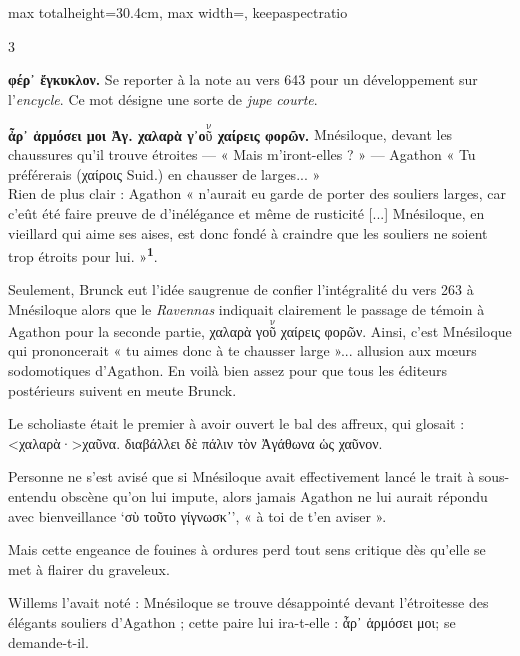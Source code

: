 \documentclass[11pt,twoside]{book}
\newcommand{\italique}[1]{\textit{#1}}
\newcommand{\auDessus}[2]{$\overset{\text{#2}}{\text{#1}}$}
\newlength{\larg}
\newcommand{\marqueur}[1]{\textsuperscript{\color{rubricRed}\textbf{#1}}}
\begin{document}
\begin{adjustbox}{max totalheight=30.4cm, max width=\textwidth, keepaspectratio}
\begin{minipage}{\textwidth}
{\begin{multicols}{3}
\par\vspace{1.5pt}
 \textbf{φέρ᾽ ἔγκυκλον.} Se reporter à la note au vers 643 pour un développement sur l'\italique{encycle}. Ce mot désigne une sorte de \italique{jupe courte}.
\par\vspace{1.5pt}
 \textbf{ἆρ᾽ ἁρμόσει μοι Ἀγ. χαλαρὰ γ᾽ο\auDessus{ῦ}{ν} χαίρεις φορῶν.} Mnésiloque, devant les chaussures qu'il trouve étroites --- « Mais m'iront-elles ? » --- Agathon « Tu préférerais (χαίροις Suid.) en chausser de larges... »\\ Rien de plus clair : Agathon « n'aurait eu garde de porter des souliers larges, car c'eût été faire preuve de d'inélégance et même de rusticité [...] Mnésiloque, en vieillard qui aime ses aises, est donc fondé à craindre que les souliers ne soient trop étroits pour lui. »\marqueur{1}.
\par\vspace{1.5pt}
\noindent Seulement, Brunck eut l'idée saugrenue de confier l'intégralité du vers 263 à Mnésiloque alors que le \italique{Ravennas} indiquait clairement le passage de témoin à Agathon pour la seconde partie, χαλαρὰ γο\auDessus{ῦ}{ν} χαίρεις φορῶν. Ainsi, c'est Mnésiloque qui prononcerait « tu aimes donc à te chausser large »... allusion aux mœurs sodomotiques d'Agathon. En voilà bien assez pour que tous les éditeurs postérieurs suivent en meute Brunck.
\par\vspace{1.5pt}
\noindent Le scholiaste était le premier à avoir ouvert le bal des affreux, qui glosait : <χαλαρὰ·>χαῦνα. διαβάλλει δὲ πάλιν τὸν Ἀγάθωνα ὡς χαῦνον.
\par\vspace{1.5pt}
\noindent Personne ne s'est avisé que si Mnésiloque avait effectivement lancé le trait à sous-entendu obscène qu'on lui impute, alors jamais Agathon ne lui aurait répondu avec bienveillance `σὺ τοῦτο γίγνωσκ᾽', « à toi de t'en aviser ».
\par\vspace{1.5pt}
\noindent Mais cette engeance de fouines à ordures perd tout sens critique dès qu'elle se met à flairer du graveleux.
\par\vspace{1.5pt}
\noindent Willems l'avait noté : Mnésiloque se trouve désappointé devant l'étroitesse des élégants souliers d'Agathon ; cette paire lui ira-t-elle : ἆρ᾽ ἁρμόσει μοι; se demande-t-il.

\end{multicols}}
\end{minipage}
\end{adjustbox}
\end{document}
